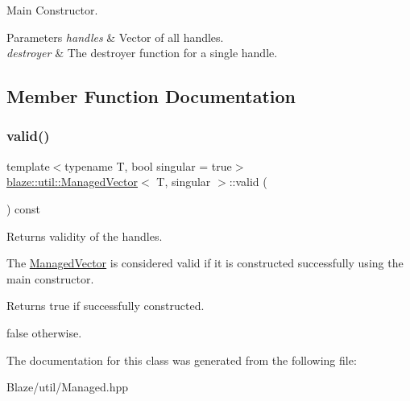 Main Constructor. 


\begin{DoxyParams}{Parameters}
{\em handles} & Vector of all handles. \\
\hline
{\em destroyer} & The destroyer function for a single handle. \\
\hline
\end{DoxyParams}


\subsection{Member Function Documentation}
\mbox{\label{classblaze_1_1util_1_1ManagedVector_a583d0bfad0ed4c1e0dc32c800124a187}} 
\subsubsection{\texorpdfstring{valid()}{valid()}}
{\footnotesize\ttfamily template$<$typename T, bool singular = true$>$ \\
\hyperlink{classblaze_1_1util_1_1ManagedVector}{blaze\+::util\+::\+Managed\+Vector}$<$ T, singular $>$\+::valid (\begin{DoxyParamCaption}{ }\end{DoxyParamCaption}) const\hspace{0.3cm}{\ttfamily [inline]}}



Returns validity of the handles. 

The \hyperlink{classblaze_1_1util_1_1ManagedVector}{Managed\+Vector} is considered valid if it is constructed successfully using the main constructor.

\begin{DoxyReturn}{Returns}
true if successfully constructed. 

false otherwise. 
\end{DoxyReturn}


The documentation for this class was generated from the following file\+:\begin{DoxyCompactItemize}
\item 
Blaze/util/Managed.\+hpp\end{DoxyCompactItemize}

